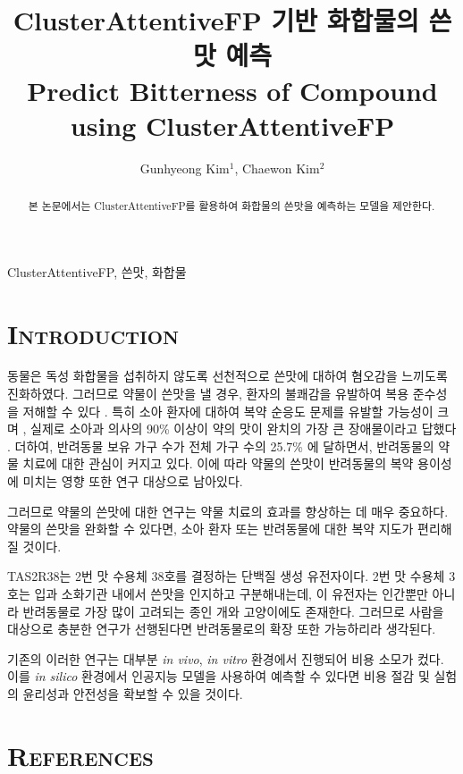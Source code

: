\documentclass[9pt]{ieeeconf}
\title{ClusterAttentiveFP 기반 화합물의 쓴맛 예측\\
        \large Predict Bitterness of Compound using ClusterAttentiveFP}
\author{Gunhyeong Kim$^{1}$, Chaewon Kim$^{2}$}
\begin{document}
\maketitle
    \begin{abstract}
        본 논문에서는 ClusterAttentiveFP를 활용하여 화합물의 쓴맛을 예측하는 모델을 제안한다.
    \end{abstract}
    \begin{keywords}
        ClusterAttentiveFP, 쓴맛, 화합물
    \end{keywords}


\section[short]{\Large {\textsc{Introduction}}}
    
\indent 동물은 독성 화합물을 섭취하지 않도록 선천적으로 쓴맛에 대하여 혐오감을 느끼도록 진화하였다.
그러므로 약물이 쓴맛을 낼 경우, 환자의 불쾌감을 유발하여 복용 준수성을 저해할 수 있다 \cite{dagan2017bitter}.
특히 소아 환자에 대하여 복약 순응도 문제를 유발할 가능성이 크며 \cite{bahia2018bitterness},
실제로 소아과 의사의 90\% 이상이 약의 맛이 완치의 가장 큰 장애물이라고 답했다 \cite{mennella2013bad}.
더하여, 반려동물 보유 가구 수가 전체 가구 수의 25.7\% 에 달하면서, 반려동물의 약물 치료에 대한 관심이 커지고 있다.
이에 따라 약물의 쓴맛이 반려동물의 복약 용이성에 미치는 영향 또한 연구 대상으로 남아있다.

\indent 그러므로 약물의 쓴맛에 대한 연구는 약물 치료의 효과를 향상하는 데 매우 중요하다.
약물의 쓴맛을 완화할 수 있다면, 소아 환자 또는 반려동물에 대한 복약 지도가 편리해질 것이다.

\indent TAS2R38는 2번 맛 수용체 38호를 결정하는 단백질 생성 유전자이다.
2번 맛 수용체 3호는 입과 소화기관 내에서 쓴맛을 인지하고 구분해내는데, 이 유전자는 인간뿐만 아니라 반려동물로 가장 많이 고려되는 종인 개와 고양이에도 존재한다.
그러므로 사람을 대상으로 충분한 연구가 선행된다면 반려동물로의 확장 또한 가능하리라 생각된다.

\indent 기존의 이러한 연구는 대부분 \textit{in vivo}, \textit{in vitro} 환경에서 진행되어 비용 소모가 컸다.
이를 \textit{in silico} 환경에서 인공지능 모델을 사용하여 예측할 수 있다면 비용 절감 및 실험의 윤리성과 안전성을 확보할 수 있을 것이다.



\section[short]{\Large {\textsc{References}}}


\end{document}
